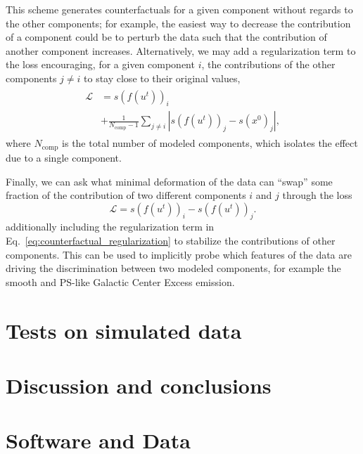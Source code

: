 \documentclass[nohyperref]{article}
\theoremstyle{plain}
\theoremstyle{definition}
\theoremstyle{remark}
\begin{document}
This scheme generates counterfactuals for a given component without regards to the other components; for example, the easiest way to decrease the contribution of a component could be to perturb the data such that the contribution of another component increases. Alternatively, we may add a regularization term to the loss encouraging, for a given component $i$, the contributions of the other components $j\neq i$ to stay close to their original values,
\begin{align}
    \label{eq:counterfactual_regularization}
    \begin{split}
    \mathcal L &= s\left(f(u^{t})\right)_i \\
    &+ {\frac{1}{N_\mathrm{comp} - 1}\sum_{j\neq i} \left| s\left(f(u^{t})\right)_{j} - s(x^0)_{j} \right|},
    \end{split}
\end{align}
where $N_\mathrm{comp}$ is the total number of modeled components, which isolates the effect due to a single component.

Finally, we can ask what minimal deformation of the data can ``swap'' some fraction of the contribution of two different components $i$ and $j$ through the loss 
\begin{equation}
    \mathcal L = s\left(f(u^{t})\right)_i - s\left(f(u^{t})\right)_j.
\end{equation}
additionally including the regularization term in Eq.~\ref{eq:counterfactual_regularization} to stabilize the contributions of other components. This can be used to implicitly probe which features of the data are driving the discrimination between two modeled components, for example the smooth and PS-like Galactic Center Excess emission.

\section{Tests on simulated data}

\lipsum[1-2]


\section{Discussion and conclusions}

\lipsum[1-3]

\section*{Software and Data}
\end{document}
